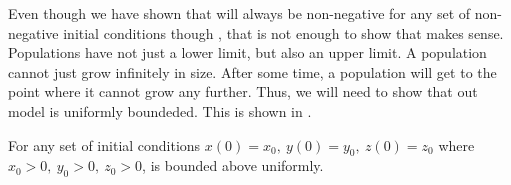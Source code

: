 Even though we have shown that  will always be non-negative for any set of non-negative initial conditions though , that is not enough to show that  makes sense. Populations have not just a lower limit, but also an upper limit. A population cannot just grow infinitely in size. After some time, a population will get to the point where it cannot grow any further. Thus, we will need to show that out model is uniformly boundeded. This is shown in .

\begin{theorem}\label{thm:bounded}
    For any set of initial conditions $x(0) = x_0,\ y(0) = y_0,\ z(0) = z_0$ where $x_0 > 0,\ y_0 > 0,\ z_0 > 0$,  is bounded above uniformly.
\end{theorem}
